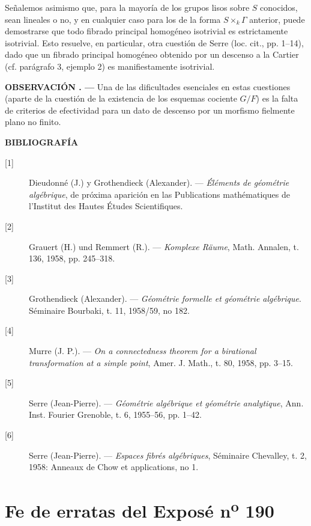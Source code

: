 \documentclass[11pt,twoside,openany]{book}
\numberwithin{equation}{section}
\newcommand{\src}[1]{%
  \phantomsection\hypertarget{src:#1}{}%
  \marginpar{\raggedleft\footnotesize\sffamily #1}%
}
\theoremstyle{plain}
\theoremstyle{definition}
\theoremstyle{remark}
\newcommand{\result}[2]{%
  \par\medskip\noindent\textbf{#1%
  \if\relax\detokenize{#2}\relax\else\space#2\fi. ---}\enspace
}
\newcommand{\FgaUnitKey}{frontmatter}
\renewcommand{\src}[1]{%
  \phantomsection\hypertarget{src:\FgaUnitKey:#1}{}%
  \marginpar{\raggedleft\footnotesize\sffamily #1}%
}
\theoremstyle{plain}
\theoremstyle{definition}
\theoremstyle{remark}
\begin{document}
Señalemos asimismo que, para la mayoría de los grupos lisos sobre $S$ conocidos,
sean lineales o no, y en cualquier caso para los de la forma
$S\times_k\Gamma$ anterior, puede demostrarse que todo fibrado principal
homogéneo isotrivial es estrictamente isotrivial. Esto resuelve, en particular,
otra cuestión de Serre (loc. cit., pp. 1--14), dado que un fibrado principal
homogéneo obtenido por un descenso a la Cartier (cf. parágrafo 3, ejemplo 2) es
manifiestamente isotrivial.

\result{OBSERVACIÓN}{} Una de las dificultades esenciales en estas cuestiones
(aparte de la cuestión de la existencia de los esquemas cociente $G/F$) es la
falta de criterios de efectividad para un dato de descenso por un morfismo
fielmente plano no finito.

\src{327}
\begin{center}
  \textbf{BIBLIOGRAFÍA}
\end{center}

\begin{description}
  \item[{[1]}] Dieudonné (J.) y Grothendieck (Alexander). --- \emph{Éléments
    de géométrie algébrique}, de próxima aparición en las Publications
    mathématiques de l'Institut des Hautes Études Scientifiques.
  \item[{[2]}] Grauert (H.) und Remmert (R.). --- \emph{Komplexe Räume}, Math.
    Annalen, t. 136, 1958, pp. 245--318.
  \item[{[3]}] Grothendieck (Alexander). --- \emph{Géométrie formelle et
    géométrie algébrique}. Séminaire Bourbaki, t. 11, 1958/59, no 182.
  \item[{[4]}] Murre (J. P.). --- \emph{On a connectedness theorem for a
    birational transformation at a simple point}, Amer. J. Math., t. 80, 1958,
    pp. 3--15.
  \item[{[5]}] Serre (Jean-Pierre). --- \emph{Géométrie algébrique et géométrie
    analytique}, Ann. Inst. Fourier Grenoble, t. 6, 1955--56, pp. 1--42.
  \item[{[6]}] Serre (Jean-Pierre). --- \emph{Espaces fibrés algébriques},
    Séminaire Chevalley, t. 2, 1958: Anneaux de Chow et applications, no 1.
\end{description}

\def\FgaUnitKey{e190}\clearpage
\chapter*{Fe de erratas del Exposé n\textsuperscript{o} 190}
\setcounter{footnote}{0}
\src{300}
\end{document}

